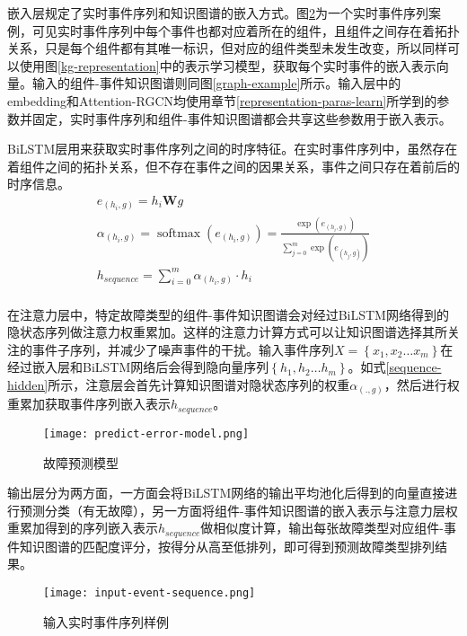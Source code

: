 嵌入层规定了实时事件序列和知识图谱的嵌入方式。图\ref{input-event-sequence}为一个实时事件序列案例，可见实时事件序列中每个事件也都对应着所在的组件，且组件之间存在着拓扑关系，只是每个组件都有其唯一标识，但对应的组件类型未发生改变，所以同样可以使用图\ref{kg-representation}中的表示学习模型，获取每个实时事件的嵌入表示向量。输入的组件-事件知识图谱则同图\ref{graph-example}所示。输入层中的embedding和Attention-RGCN均使用章节\ref{representation-paras-learn}所学到的参数并固定，实时事件序列和组件-事件知识图谱都会共享这些参数用于嵌入表示。

BiLSTM层用来获取实时事件序列之间的时序特征。在实时事件序列中，虽然存在着组件之间的拓扑关系，但不存在事件之间的因果关系，事件之间只存在着前后的时序信息。
\begin{equation}
    \begin{array}{l}
    e_{(h_{i} , g)} = h_{i}\mathbf{W}g\\
    \alpha_{(h_{i} , g)}=\operatorname{softmax}\left(e_{(h_{i} , g)}\right)=\frac{\exp \left(e_{(h_{i} , g)}\right)}{\sum_{j=0}^{m}  \exp \left(e_{\left(h_{j} , g\right )}\right)}\\
    h_{sequence} = \sum_{i=0}^{m}\alpha_{(h_{i} , g)}\cdot h_{i}\\
    \end{array}
    \label{sequence-hidden}
\end{equation}

在注意力层中，特定故障类型的组件-事件知识图谱会对经过BiLSTM网络得到的隐状态序列做注意力权重累加。这样的注意力计算方式可以让知识图谱选择其所关注的事件子序列，并减少了噪声事件的干扰。输入事件序列$X=\left\{x_{1}, x_{2} \ldots x_{m}\right\}$在经过嵌入层和BiLSTM网络后会得到隐向量序列$\left\{h_{1}, h_{2} \ldots h_{m}\right\}$。如式\ref{sequence-hidden}所示，注意层会首先计算知识图谱对隐状态序列的权重$\alpha_{(. , g)}$，然后进行权重累加获取事件序列嵌入表示$h_{sequence}$。

\begin{figure}[htbp]
    \centering
    \texttt{[image: predict-error-model.png]}
    \caption{故障预测模型\label{predict-error-model}}
\end{figure}
输出层分为两方面，一方面会将BiLSTM网络的输出平均池化后得到的向量直接进行预测分类（有无故障），另一方面将组件-事件知识图谱的嵌入表示与注意力层权重累加得到的序列嵌入表示$h_{sequence}$做相似度计算，输出每张故障类型对应组件-事件知识图谱的匹配度评分，按得分从高至低排列，即可得到预测故障类型排列结果。
\begin{figure}[htbp]
    \centering
    \texttt{[image: input-event-sequence.png]}
    \caption{输入实时事件序列样例\label{input-event-sequence}}
\end{figure}
